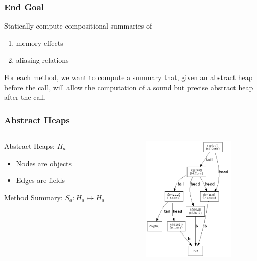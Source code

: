 \documentclass[hyperref={pdfpagelabels=false}]{beamer}
\begin{document}
\begin{frame}
\frametitle{End Goal}
    Statically compute compositional summaries of
    \begin{enumerate}
        \item memory effects
        \item aliasing relations
    \end{enumerate}

    \vspace{25pt}
    For each method, we want to compute a summary that, given an abstract heap
    before the call, will allow the computation of a sound but precise abstract
    heap after the call.
\end{frame}

\begin{frame}
\frametitle{Abstract Heaps}
  \begin{columns}
    \begin{column}{0.4\textwidth}

        Abstract Heaps: $H_a$
        \begin{itemize}
            \item Nodes are objects
            \item Edges are fields
        \end{itemize}

        \vspace{10pt}
        Method Summary:
        $S_a : H_a \mapsto H_a$


    \end{column}
    \begin{column}{0.6\textwidth}
      \begin{figure}[t]
            \includegraphics[height=60mm]{images/aheap.png}\\
      \end{figure}
    \end{column}
  \end{columns}
\end{frame}
\end{document}
